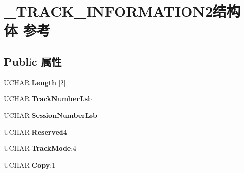 \hypertarget{struct___t_r_a_c_k___i_n_f_o_r_m_a_t_i_o_n2}{}\section{\+\_\+\+T\+R\+A\+C\+K\+\_\+\+I\+N\+F\+O\+R\+M\+A\+T\+I\+O\+N2结构体 参考}
\label{struct___t_r_a_c_k___i_n_f_o_r_m_a_t_i_o_n2}
\subsection*{Public 属性}
\begin{DoxyCompactItemize}
\item 
\mbox{\label{struct___t_r_a_c_k___i_n_f_o_r_m_a_t_i_o_n2_aa3b983cd258612187a87b80f8959d57b}} 
U\+C\+H\+AR {\bfseries Length} \mbox{[}2\mbox{]}
\item 
\mbox{\label{struct___t_r_a_c_k___i_n_f_o_r_m_a_t_i_o_n2_a2c48542ef684f6bdda7993302bab88ca}} 
U\+C\+H\+AR {\bfseries Track\+Number\+Lsb}
\item 
\mbox{\label{struct___t_r_a_c_k___i_n_f_o_r_m_a_t_i_o_n2_aa796a303f7d84774602ff896a8b60113}} 
U\+C\+H\+AR {\bfseries Session\+Number\+Lsb}
\item 
\mbox{\label{struct___t_r_a_c_k___i_n_f_o_r_m_a_t_i_o_n2_ad684104d31290f1c0d43e71f860cb300}} 
U\+C\+H\+AR {\bfseries Reserved4}
\item 
\mbox{\label{struct___t_r_a_c_k___i_n_f_o_r_m_a_t_i_o_n2_a73774770e6c585ca6d08e0f5caa7b882}} 
U\+C\+H\+AR {\bfseries Track\+Mode}\+:4
\item 
\mbox{\label{struct___t_r_a_c_k___i_n_f_o_r_m_a_t_i_o_n2_a2b3aeca3a041ed3d779447d0269e0085}} 
U\+C\+H\+AR {\bfseries Copy}\+:1
\item 
\mbox{\label{struct___t_r_a_c_k___i_n_f_o_r_m_a_t_i_o_n2_a4a8617df195101cd7a85f27d7fb38d06}} 

\end{DoxyCompactItemize}
